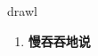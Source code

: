 
\begin{frame}
{\huge drawl}
\begin{center}
\begin{enumerate}\Large
  \item \textbf{慢吞吞地说}
\end{enumerate}
\end{center}
\end{frame}
